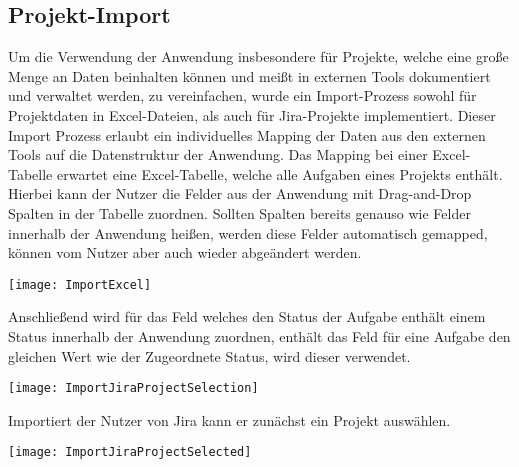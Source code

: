 \subsection{Projekt-Import}
Um die Verwendung der Anwendung insbesondere für Projekte, welche eine große Menge an Daten beinhalten können und meißt in externen Tools dokumentiert und verwaltet werden, zu vereinfachen, wurde ein Import-Prozess sowohl für Projektdaten in Excel-Dateien, als auch für Jira-Projekte implementiert. Dieser Import Prozess erlaubt ein individuelles Mapping der Daten aus den externen Tools auf die Datenstruktur der Anwendung. Das Mapping bei einer Excel-Tabelle erwartet eine Excel-Tabelle, welche alle Aufgaben eines Projekts enthält. Hierbei kann der Nutzer  die Felder aus der Anwendung mit Drag-and-Drop Spalten in der Tabelle zuordnen. Sollten Spalten bereits genauso wie Felder innerhalb der Anwendung heißen, werden diese Felder automatisch gemapped, können vom Nutzer aber auch wieder abgeändert werden.

\vspace{20pt}
\begin{center}
    \begin{minipage}{1\linewidth}
        \texttt{[image: ImportExcel]}
    \end{minipage}
\end{center}
\vspace{20pt}

Anschließend wird für das Feld welches den Status der Aufgabe enthält einem Status innerhalb der Anwendung zuordnen, enthält das Feld für eine Aufgabe den gleichen Wert wie der Zugeordnete Status, wird dieser verwendet.

\vspace{20pt}
\begin{center}
    \begin{minipage}{1\linewidth}
        \texttt{[image: ImportJiraProjectSelection]}
    \end{minipage}
\end{center}
\vspace{20pt}

Importiert der Nutzer von Jira kann er zunächst ein Projekt auswählen.

\vspace{20pt}
\begin{center}
    \begin{minipage}{1\linewidth}
        \texttt{[image: ImportJiraProjectSelected]}
    \end{minipage}
\end{center}
\vspace{20pt}

